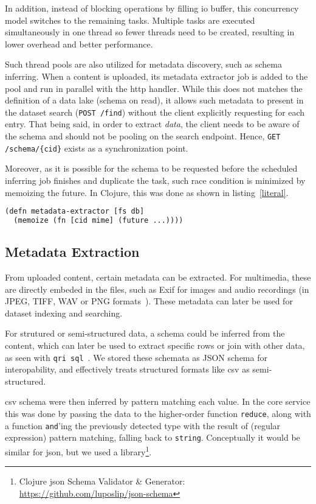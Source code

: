 In addition, instead of blocking operations by filling \gls{io} buffer,
this concurrency model switches to the remaining tasks.  Multiple tasks
are executed simultaneously in one thread so fewer threads need to be created,
resulting in lower overhead and better performance.

Such thread pools are also utilized for metadata discovery, such as
schema inferring.  When a \gls{content} is uploaded, its metadata extractor job
is added to the pool and run in parallel with the \gls{http} handler.
While this does not matches the definition of a data lake (schema on read),
it allows such metadata to present in the dataset search (\verb|POST /find|)
without the client explicitly requesting for each entry.  That being said,
in order to extract \emph{data}, the client needs to be aware of the schema
and should not be pooling on the search endpoint.  Hence,
\verb|GET /schema/{cid}| exists as a synchronization point.

Moreover, as it is possible for the schema to be requested before the scheduled
inferring job finishes and duplicate the task, such race condition is minimized
by memoizing the future.  In Clojure, this was done as shown
in listing~\ref{literal}.
\begin{lstlisting}[label=literal,caption=Constructing
  a metadata extractor,language=lisp]
(defn metadata-extractor [fs db]
  (memoize (fn [cid mime] (future ...))))
\end{lstlisting}

\subsection{Metadata Extraction}
From uploaded content, certain metadata can be extracted.  For multimedia,
these are directly embeded in the files, such as Exif for images
and audio recordings (in JPEG, TIFF, WAV or PNG formats~\cite{exif}).
These metadata can later be used for dataset indexing and searching.

For strutured or semi-structured data, a schema could be inferred from
the content, which can later be used to extract specific rows or join
with other data, as seen with \verb|qri sql|~\cite{qricli}.  We stored
these schemata as JSON schema for interopability, and effectively treats
structured formats like \gls{csv} as semi-structured.

\gls{csv} schema were then inferred by pattern matching each value.
In the core service this was done by passing the data to the higher-order
function \verb|reduce|, along with a function \verb|and|'ing the previously
detected type with the result of (regular expression) pattern matching,
falling back to \verb|string|.  Conceptually it would be similar for \gls{json},
but we used a library\footnote{Clojure \gls{json} Schema Validator \& Generator:
\url{https://github.com/luposlip/json-schema}}.


